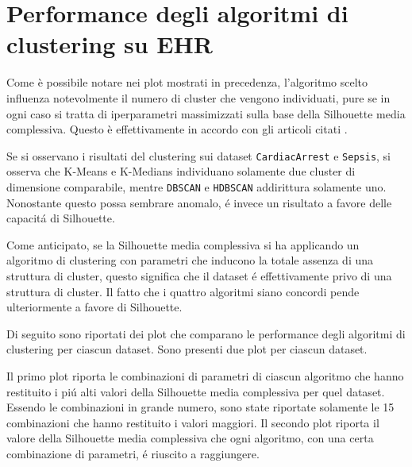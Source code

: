 \documentclass[a4paper, 12pt]{report}
\begin{document}
		\section{Performance degli algoritmi di clustering su EHR}

			Come è possibile notare nei plot mostrati in precedenza,
			l'algoritmo scelto influenza notevolmente il numero di
			cluster che vengono individuati, pure se in ogni caso si
			tratta di iperparametri massimizzati sulla base della
			Silhouette media complessiva. Questo è effettivamente in
			accordo con gli articoli citati
			\cite{doi:10.3233/IDA-2012-0545}.

			Se si osservano i risultati del clustering sui dataset
			\texttt{CardiacArrest} e \texttt{Sepsis}, si osserva che
			K-Means e K-Medians individuano solamente due cluster di
			dimensione comparabile, mentre \texttt{DBSCAN} e
			\texttt{HDBSCAN} addirittura solamente uno. Nonostante
			questo possa sembrare anomalo, é invece un risultato a
			favore delle capacitá di Silhouette.

			Come anticipato, se la Silhouette media complessiva si ha
			applicando un algoritmo di clustering con parametri che
			inducono la totale assenza di una struttura di cluster,
			questo significa che il dataset é effettivamente privo di
			una struttura di cluster. Il fatto che i quattro algoritmi
			siano concordi pende ulteriormente a favore di Silhouette.

			Di seguito sono riportati dei plot che comparano le
			performance degli algoritmi di clustering per ciascun
			dataset. Sono presenti due plot per ciascun dataset.

			Il primo plot riporta le combinazioni di parametri di ciascun
			algoritmo che hanno restituito i piú alti valori della Silhouette
			media complessiva per quel dataset. Essendo le combinazioni in
			grande numero, sono state riportate solamente le 15 combinazioni
			che hanno restituito i valori maggiori. Il secondo plot riporta
			il valore della Silhouette media complessiva che ogni algoritmo,
			con una certa combinazione di parametri, é riuscito a raggiungere.
\end{document}
